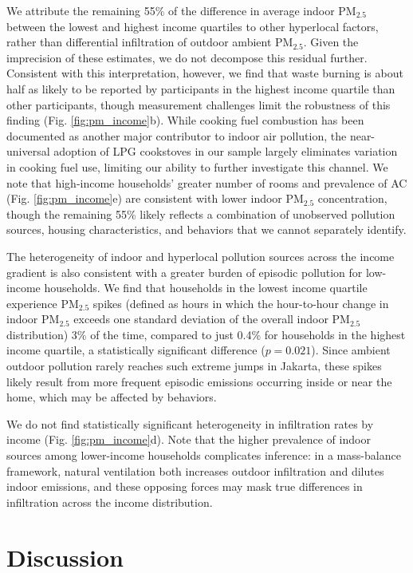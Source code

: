 \documentclass[9pt,twocolumn,twoside]{pnas-new}
\begin{document}
We attribute the remaining 55\% of the difference in average indoor PM$_{2.5}$ between the lowest and highest income quartiles to other hyperlocal factors, rather than differential infiltration of outdoor ambient PM$_{2.5}$. Given the imprecision of these estimates, we do not decompose this residual further. Consistent with this interpretation, however, we find that waste burning is about half as likely to be reported by participants in the highest income quartile than other participants, though measurement challenges limit the robustness of this finding (Fig. \ref{fig:pm_income}b). While cooking fuel combustion has been documented as another major contributor to indoor air pollution, the near-universal adoption of LPG cookstoves in our sample largely eliminates variation in cooking fuel use, limiting our ability to further investigate this channel. We note that high-income households’ greater number of rooms and prevalence of AC (Fig. \ref{fig:pm_income}e) are consistent with lower indoor PM$_{2.5}$ concentration, though the remaining 55\% likely reflects a combination of unobserved pollution sources, housing characteristics, and behaviors that we cannot separately identify.

The heterogeneity of indoor and hyperlocal pollution sources across the income gradient is also consistent with a greater burden of episodic pollution for low-income households. We find that households in the lowest income quartile experience PM$_{2.5}$ spikes (defined as hours in which the hour-to-hour change in indoor PM$_{2.5}$ exceeds one standard deviation of the overall indoor PM$_{2.5}$ distribution) 3\% of the time, compared to just 0.4\% for households in the highest income quartile, a statistically significant difference ($p = 0.021$). Since ambient outdoor pollution rarely reaches such extreme jumps in Jakarta, these spikes likely result from more frequent episodic emissions occurring inside or near the home, which may be affected by behaviors.

We do not find statistically significant heterogeneity in infiltration rates by income (Fig. \ref{fig:pm_income}d). Note that the higher prevalence of indoor sources among lower-income households complicates inference: in a mass-balance framework, natural ventilation both increases outdoor infiltration and dilutes indoor emissions, and these opposing forces may mask true differences in infiltration across the income distribution.

\section{Discussion}
\end{document}
